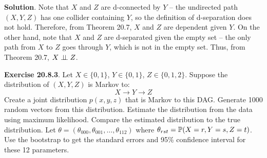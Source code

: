 \textbf{Solution}.
Note that \(X\) and \(Z\) are d-connected by \(Y\) -- the undirected
path \((X, Y, Z)\) has one collider containing \(Y\), so the definition
of d-separation does not hold. Therefore, from Theorem 20.7, \(X\) and
\(Z\) are dependent given \(Y\).
On the other hand, note that \(X\) and \(Z\) are d-separated given the
empty set -- the only path from \(X\) to \(Z\) goes through \(Y\), which
is not in the empty set. Thus, from Theorem 20.7, \(X \perp\!\!\!\perp Z\).

\textbf{Exercise 20.8.3}. Let \(X \in \{0, 1\}\), \(Y \in \{0, 1\}\),
\(Z \in \{ 0, 1, 2 \}\). Suppose the distribution of \((X, Y, Z)\) is
Markov to:
\[
X \longrightarrow Y \longrightarrow Z
\]
Create a joint distribution \(p(x, y, z)\) that is Markov to this DAG.
Generate 1000 random vectors from this distribution. Estimate the
distribution from the data using maximum likelihood. Compare the
estimated distribution to the true distribution. Let
\(\theta = (\theta_{000}, \theta_{001}, \dots, \theta_{112})\) where
\(\theta_{rst} = \operatorname{\mathbb{P}}(X = r, Y = s, Z = t)\). Use the bootstrap to
get the standard errors and 95\% confidence interval for these 12
parameters.

